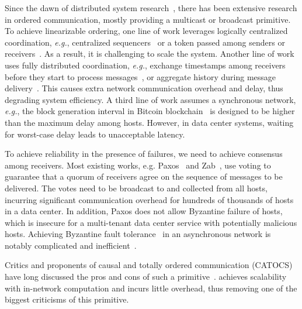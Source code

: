 Since the dawn of distributed system research~\cite{lamport1978time}, there has been extensive research in ordered communication, mostly providing a multicast or broadcast primitive.
To achieve linearizable ordering, one line of work leverages logically centralized coordination, \textit{e.g.}, centralized sequencers~\cite{eris} or a token passed among senders or receivers~\cite{rajagopalan1989token,kim1997total,ekwall2004token}.
As a result, it is challenging to scale the system.
Another line of work uses fully distributed coordination, \textit{e.g.}, exchange timestamps among receivers before they start to process messages~\cite{lamport1978time}, or aggregate history during message delivery~\cite{chandra1996unreliable}.
This causes extra network communication overhead and delay, thus degrading system efficiency.
A third line of work assumes a synchronous network, \textit{e.g.}, the block generation interval in Bitcoin blockchain~\cite{nakamoto2008bitcoin} is designed to be higher than the maximum delay among hosts.
However, in data center systems, waiting for worst-case delay leads to unacceptable latency.

To achieve reliability in the presence of failures, we need to achieve consensus among receivers.
Most existing works, e.g. Paxos~\cite{lamport1998part} and Zab~\cite{junqueira2011zab}, use voting to guarantee that a quorum of receivers agree on the sequence of messages to be delivered.
The votes need to be broadcast to and collected from all hosts, incurring significant communication overhead for hundreds of thousands of hosts in a data center.
In addition, Paxos does not allow Byzantine failure of hosts, which is insecure for a multi-tenant data center service with potentially malicious hosts.
Achieving Byzantine fault tolerance~\cite{lamport1982byzantine,castro1999practical,kotla2007zyzzyva} in an asynchronous network is notably complicated and inefficient~\cite{mickens2014saddest}.

Critics and proponents of causal and totally ordered communication (CATOCS) have long discussed the pros and cons of such a primitive~\cite{cheriton1994understanding,birman1994response,van1994bother}. 
\sys achieves scalability with in-network computation and incurs little overhead, thus removing one of the biggest criticisms of this primitive.

